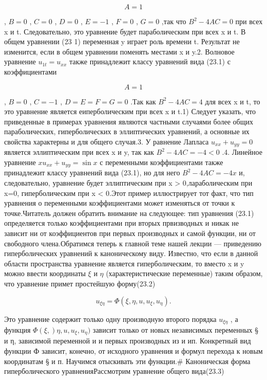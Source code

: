 \documentclass[
  ukrainian,
]{article}
\begin{document}
\[
A=1
\]

, \(B=0\) , \(C=0\) , \(D=0\) , \(E=-1\) , \(F=0\) , \(G=0\) ,так что
\(B^2-4AC=0\) при всех x и t. Следовательно, это уравнение будет
параболическим при всех x и t. В общем уравнении (23 1) переменная y
играет роль времени t. Результат не изменится, если в общем уравнении
поменять местами x и y.2. Волновое уравнение \(u_{1t} = u_{xx}\) также
принадлежит классу уравнений вида (23.1) с коэффициентами

\[
A=1
\]

, \(B=0\) , \(C=-1\) , \(D=E=F=G=0\) .Так как \(B^2 - 4AC = 4\) для всех
x и t, то это уравнение является еиперболическим при всех x и t.1)
Следует указать, что приведенные в примерах уравнения являются частными
случаями более общих параболических, гиперболических в эллиптических
уравнений, а основные их свойства характерны и для общего случая.3. У
равнение Лапласа \(u_{xx} + u_{yy} = 0\) является эллиптическим при всех
x и y, так как \(B^2 - 4AC = - 4 < 0\) .4. Линейное уравнение
\(xu_{xx} + u_{yy} = \sin x\) с переменными коэффициентами также
принадлежит классу уравнений вида (23.1), но для него \(B^2-4AC=-4x\) и,
следовательно, уравнение будет эллиптическим при x \textgreater{}
0,лараболическим при x=0, гиперболическим при x \textless{} 0.Этот
пример иллюстрирует тот факт, что тип уравнения о переменными
коэффициентами может изменяться от точки к точке.Читатель должен
обратить внимание на следующее: тип уравнения (23.1) определяется только
коэффициентами при вторых првизводных и никак не зависит ни от
коэффициентов при первых производных и самой функции, ни от свободного
члена.Обратимся теперь к главной теме нашей лекции --- приведению
гиперболических уравнений к каноническому виду. Известно, что если в
данной области пространства уравнение является гиперболическим, то
вместо x и y можно ввести координаты \(\xi\) и \(\eta\)
(характеристические переменные) таким образом, что уравнение примет
простейшую форму(23.2)

\[
u_{\xi\eta} = \Phi(\xi, \eta, u, u_{\xi}, u_{\eta}).
\]

Это уравнение содержит только одну производную второго порядка
\(u_{\xi\eta}\) , а функция \(\Phi(\xi,) \eta,u,u_{\xi},u_{\eta})\)
зависит только от новых независимых переменных § и η, зависимой
переменной и и первых производных из и ип. Конкретный вид функции Ф
зависит, конечно, от исходного уравнения и формул перехода к новым
координатам § и п. Научимся отыскивать эти функции.\# Каноническая форма
гиперболического уравненияРассмотрим уравнение общего вида(23.3)
\end{document}
